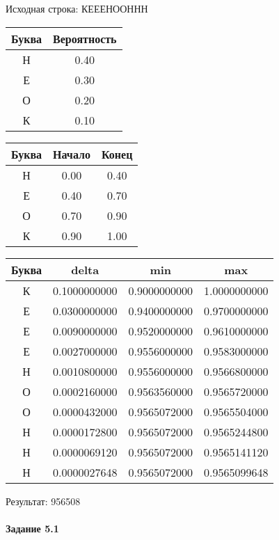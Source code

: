 \documentclass[a4paper, 12pt]{article}
\begin{document}
Исходная строка: КЕЕЕНООННН\
\begin{center}
 \begin{tabular}{ |c|c| } 
  \hline
     Буква & Вероятность \\ \hline
Н & 0.40\\\hline
Е & 0.30\\\hline
О & 0.20\\\hline
К & 0.10
\\ \hline \end{tabular}
\end{center}
\begin{center}
 \begin{tabular}{ |c|c|c| } 
  \hline
     Буква & Начало & Конец \\ \hline
Н & 0.00 & 0.40\\\hline
Е & 0.40 & 0.70\\\hline
О & 0.70 & 0.90\\\hline
К & 0.90 & 1.00
\\ \hline \end{tabular}
\end{center}
\begin{center}
 \begin{tabular}{ |c|c|c|c| } 
  \hline
     Буква & delta & min & max \\ \hline
К & 0.1000000000 & 0.9000000000 & 1.0000000000\\\hline
Е & 0.0300000000 & 0.9400000000 & 0.9700000000\\\hline
Е & 0.0090000000 & 0.9520000000 & 0.9610000000\\\hline
Е & 0.0027000000 & 0.9556000000 & 0.9583000000\\\hline
Н & 0.0010800000 & 0.9556000000 & 0.9566800000\\\hline
О & 0.0002160000 & 0.9563560000 & 0.9565720000\\\hline
О & 0.0000432000 & 0.9565072000 & 0.9565504000\\\hline
Н & 0.0000172800 & 0.9565072000 & 0.9565244800\\\hline
Н & 0.0000069120 & 0.9565072000 & 0.9565141120\\\hline
Н & 0.0000027648 & 0.9565072000 & 0.9565099648
\\ \hline \end{tabular}
\end{center}
Результат: 956508
\pagebreak
\paragraph{Задание 5.1 \\
}
\end{document}
